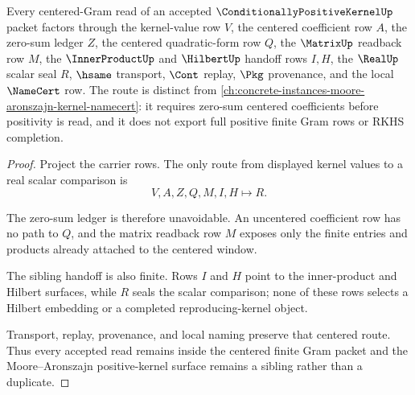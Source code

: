\begin{theorem}
\label{thm:conditionally-positive-kernel-centered-gram-route}
Every centered-Gram read of an accepted $\ConditionallyPositiveKernelUp$ packet factors through the kernel-value row $V$, the centered coefficient row $A$, the zero-sum ledger $Z$, the centered quadratic-form row $Q$, the $\MatrixUp$ readback row $M$, the $\InnerProductUp$ and $\HilbertUp$ handoff rows $I,H$, the $\RealUp$ scalar seal $R$, $\hsame$ transport, $\Cont$ replay, $\Pkg$ provenance, and the local $\NameCert$ row. The route is distinct from \autoref{ch:concrete-instances-moore-aronszajn-kernel-namecert}: it requires zero-sum centered coefficients before positivity is read, and it does not export full positive finite Gram rows or RKHS completion.
\end{theorem}
\begin{proof}
Project the carrier rows. The only route from displayed kernel values to a real scalar comparison is
$$
V,A,Z,Q,M,I,H \longmapsto R .
$$

The zero-sum ledger is therefore unavoidable. An uncentered coefficient row has no path to $Q$, and the matrix readback row $M$ exposes only the finite entries and products already attached to the centered window.

The sibling handoff is also finite. Rows $I$ and $H$ point to the inner-product and Hilbert surfaces, while $R$ seals the scalar comparison; none of these rows selects a Hilbert embedding or a completed reproducing-kernel object.

Transport, replay, provenance, and local naming preserve that centered route. Thus every accepted read remains inside the centered finite Gram packet and the Moore--Aronszajn positive-kernel surface remains a sibling rather than a duplicate.
\end{proof}



